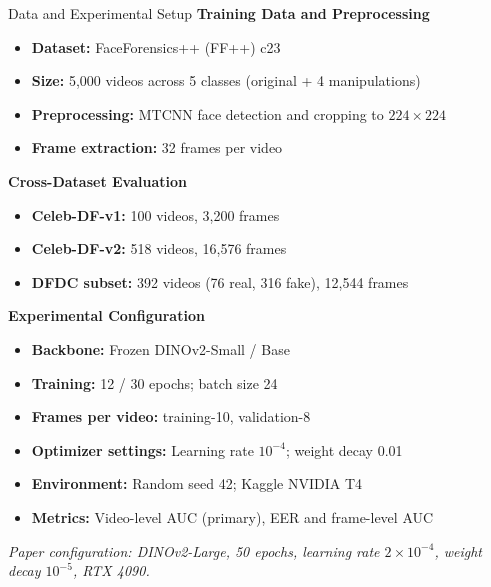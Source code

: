 \documentclass[aspectratio=169,10pt]{beamer}
\begin{document}
\begin{frame}{Data and Experimental Setup}
\footnotesize
\textbf{Training Data and Preprocessing}
\begin{itemize}
    \item \textbf{Dataset:} FaceForensics++ (FF++) c23
    \item \textbf{Size:} 5,000 videos across 5 classes (original + 4 manipulations)
    \item \textbf{Preprocessing:} MTCNN face detection and cropping to $224\times224$
    \item \textbf{Frame extraction:} 32 frames per video
\end{itemize}
\vspace{2pt}
\textbf{Cross-Dataset Evaluation}
\begin{itemize}
    \item \textbf{Celeb-DF-v1:} 100 videos, 3,200 frames
    \item \textbf{Celeb-DF-v2:} 518 videos, 16,576 frames
    \item \textbf{DFDC subset:} 392 videos (76 real, 316 fake), 12,544 frames
\end{itemize}
\vspace{2pt}
\textbf{Experimental Configuration}
\begin{itemize}
    \item \textbf{Backbone:} Frozen DINOv2-Small / Base
    \item \textbf{Training:} 12 / 30 epochs; batch size 24
    \item \textbf{Frames per video:} training-10, validation-8
    \item \textbf{Optimizer settings:} Learning rate $10^{-4}$; weight decay 0.01
    \item \textbf{Environment:} Random seed 42; Kaggle NVIDIA T4
    \item \textbf{Metrics:} Video-level AUC (primary), EER and frame-level AUC
\end{itemize}
\vspace{4pt}
\centering
\scriptsize
\textit{Paper configuration: DINOv2-Large, 50 epochs, learning rate $2\times10^{-4}$, weight decay $10^{-5}$, RTX 4090.}
\end{frame}
\end{document}
